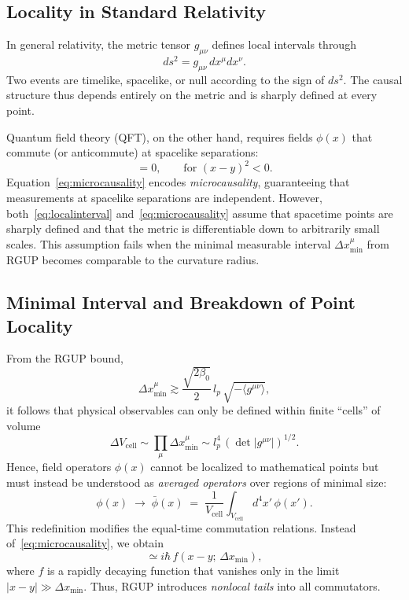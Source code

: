 \documentclass[11pt,oneside]{book}
\numberwithin{equation}{chapter}
\begin{document}
\subsection*{Locality in Standard Relativity}

In general relativity, the metric tensor \( g_{\mu\nu} \) defines local intervals through
\begin{equation}
ds^2 = g_{\mu\nu}\,dx^\mu dx^\nu.
\label{eq:localinterval}
\end{equation}
Two events are timelike, spacelike, or null according to the sign of \( ds^2 \).  
The causal structure thus depends entirely on the metric and is sharply defined at every point.

Quantum field theory (QFT), on the other hand, requires fields \( \phi(x) \) that commute (or anticommute) at spacelike separations:
\begin{equation}
[\phi(x),\phi(y)] = 0,
\qquad
\text{for } (x-y)^2 < 0.
\label{eq:microcausality}
\end{equation}
Equation~\eqref{eq:microcausality} encodes \emph{microcausality}, guaranteeing that measurements at spacelike separations are independent.  
However, both~\eqref{eq:localinterval} and~\eqref{eq:microcausality} assume that spacetime points are sharply defined and that the metric is differentiable down to arbitrarily small scales.  
This assumption fails when the minimal measurable interval \(\Delta x_{\min}^{\mu}\) from RGUP becomes comparable to the curvature radius.

\subsection*{Minimal Interval and Breakdown of Point Locality}

From the RGUP bound,
\begin{equation}
\Delta x_{\min}^{\mu}
\gtrsim 
\frac{\sqrt{2\beta_0}}{2}\,l_p\,\sqrt{-\langle g^{\mu\nu}\rangle},
\label{eq:minintervalRGUP}
\end{equation}
it follows that physical observables can only be defined within finite “cells” of volume 
\begin{equation}
\Delta V_{\text{cell}} \sim 
\prod_\mu \Delta x_{\min}^{\mu}
\sim l_p^4\,(\det|g^{\mu\nu}|)^{1/2}.
\end{equation}
Hence, field operators \( \phi(x) \) cannot be localized to mathematical points but must instead be understood as \emph{averaged operators} over regions of minimal size:
\begin{equation}
\phi(x) \;\rightarrow\;
\bar{\phi}(x)
\;=\;
\frac{1}{V_{\text{cell}}}
\int_{V_{\text{cell}}} d^4x'\,\phi(x').
\end{equation}
This redefinition modifies the equal-time commutation relations.  
Instead of~\eqref{eq:microcausality}, we obtain
\begin{equation}
[\bar{\phi}(x),\bar{\phi}(y)]
\simeq 
i\hbar\,f(x-y;\,\Delta x_{\min}),
\label{eq:nonlocalcomm}
\end{equation}
where \( f \) is a rapidly decaying function that vanishes only in the limit \( |x-y|\gg \Delta x_{\min} \).  
Thus, RGUP introduces \emph{nonlocal tails} into all commutators.
\end{document}
